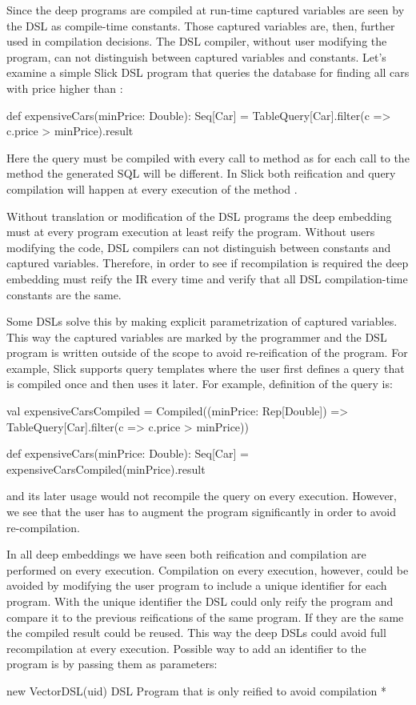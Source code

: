 Since the deep programs are compiled at run-time captured variables are seen by the DSL
  as compile-time constants. Those captured variables are, then, further used in compilation
  decisions. The DSL compiler, without user modifying the program, can not distinguish between
  captured variables and constants.  Let's examine a simple Slick DSL program that queries the database
  for finding all cars with price higher than :\begin{lstparagraph}
def expensiveCars(minPrice: Double): Seq[Car] =
  TableQuery[Car].filter(c => c.price > minPrice).result
\end{lstparagraph}
Here the query must be compiled with every call to  method as for
each call to the method the generated SQL will be different. In Slick both reification
and query compilation will happen at every execution of the method .


Without translation or modification of the DSL programs the deep embedding must
 at every program execution at least reify the program.
 Without users modifying the code, DSL compilers can not distinguish between
 constants and captured variables. Therefore, in order to see if recompilation is required
 the deep embedding must reify the IR every time and verify that all DSL compilation-time
 constants are the same.

Some DSLs solve this by making explicit parametrization of captured variables. This way the captured
 variables are marked by the programmer and the DSL program is written outside of the scope to avoid
 re-reification of the program. For example, Slick supports query templates where the user first
 defines a query that is compiled once and then uses it later. For example, definition of the  query is:\begin{lstparagraph}
val expensiveCarsCompiled = Compiled((minPrice: Rep[Double]) =>
  TableQuery[Car].filter(c => c.price > minPrice))

def expensiveCars(minPrice: Double): Seq[Car] =
  expensiveCarsCompiled(minPrice).result
 \end{lstparagraph}
 and its later usage would not recompile the query on every execution. However, we see that
 the user has to augment the program significantly in order to avoid re-compilation.

In all deep embeddings we have seen both reification and compilation are performed on every
 execution. Compilation on every execution, however, could be avoided by modifying the user program to include
 a unique identifier for each program. With the unique identifier the DSL could only reify
 the program and compare it to the previous reifications of the same program. If they are the same
 the compiled result could be reused. This way the deep DSLs could avoid full recompilation
 at every execution. Possible way to add an identifier to the program is by passing them as parameters:\begin{lstparagraph}
 new VectorDSL(uid) { \* DSL Program that is only reified to avoid compilation *\ }
 \end{lstparagraph}

